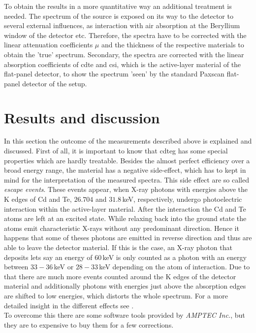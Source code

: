 To obtain the results in a more quantitative way an additional treatment is needed. The spectrum of the source is exposed on its way to the detector to several external influences, as interaction with air absorption at the Beryllium window of the detector etc. Therefore, the spectra have to be corrected with the linear attenuation coefficients $\mu$  and the thickness of the respective materials to obtain the 'true' spectrum. Secondary, the spectra are corrected with the linear absorption coefficients of \gls{cdte} and \gls{csi}, which is the active-layer material of the flat-panel detector, to show the spectrum 'seen' by the standard Paxscan flat-panel detector of the setup.    
\section{Results and discussion}\label{sec:specresults}
In this section the outcome of the measurements described above is explained and discussed. First of all, it is important to know that \gls{cdteg} has some special properties which are hardly treatable. Besides the almost perfect efficiency over a broad energy range, the material has a negative side-effect, which has to kept in mind for the interpretation of the measured spectra. This side effect are so called \textit{escape events}. These events appear, when X-ray photons with energies above the K edges of Cd and Te, $26.704$ and $31.8\,$keV, respectively, undergo photoelectric interaction within the active-layer material. After the interaction the Cd and Te atoms are left at an excited state. While relaxing back into the ground state the atoms emit characteristic X-rays without any predominant direction. Hence it happens that some of theses photons are emitted in reverse direction and thus are able to leave the detector material. If this is the case, an X-ray photon that deposits lets say an energy of $60\,$keV is only counted as a photon with an energy between $33-36\,$keV or $28-33\,$keV depending on the atom of interaction. Due to that there are much more events counted around the K edges of the detector material and additionally photons with energies just above the absorption edges are shifted to low energies, which distorts the whole spectrum. For a more detailed insight in the different effects see \citep{Redus2008}.\\
To overcome this there are some software tools provided by \textit{AMPTEC Inc.}, but they are to expensive to buy them for a few corrections.%
